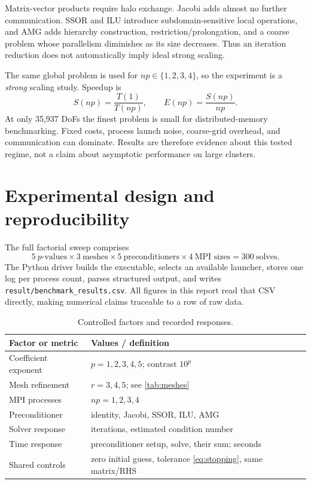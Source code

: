 \documentclass[10pt,a4paper]{article}
\begin{document}
Matrix-vector products require halo exchange. Jacobi adds almost no further communication. SSOR
and ILU introduce subdomain-sensitive local operations, and AMG adds hierarchy construction,
restriction/prolongation, and a coarse problem whose parallelism diminishes as its size decreases.
Thus an iteration reduction does not automatically imply ideal strong scaling.

The same global problem is used for $np\in\{1,2,3,4\}$, so the experiment is a \emph{strong}
scaling study. Speedup is
\begin{equation}
 S(np)=\frac{T(1)}{T(np)},\qquad E(np)=\frac{S(np)}{np}.
\end{equation}
At only 35,937 DoFs the finest problem is small for distributed-memory benchmarking. Fixed costs,
process launch noise, coarse-grid overhead, and communication can dominate. Results are therefore
evidence about this tested regime, not a claim about asymptotic performance on large clusters.

\newpage
\section{Experimental design and reproducibility}
The full factorial sweep comprises
\[
 5\ p\text{-values}\times3\ \text{meshes}\times5\ \text{preconditioners}
 \times4\ \text{MPI sizes}=300\ \text{solves}.
\]
The Python driver builds the executable, selects an available launcher, stores one log per process
count, parses structured output, and writes \texttt{result/benchmark\_results.csv}. All figures in
this report read that CSV directly, making numerical claims traceable to a row of raw data.

\begin{table}[h]
\centering
\caption{Controlled factors and recorded responses.}
\begin{tabularx}{\textwidth}{@{}lX@{}}
\toprule
Factor or metric & Values / definition\\
\midrule
Coefficient exponent & $p=1,2,3,4,5$; contrast $10^p$\\
Mesh refinement & $r=3,4,5$; see \cref{tab:meshes}\\
MPI processes & $np=1,2,3,4$\\
Preconditioner & identity, Jacobi, SSOR, ILU, AMG\\
Solver response & iterations, estimated condition number\\
Time response & preconditioner setup, solve, their sum; seconds\\
Shared controls & zero initial guess, tolerance \cref{eq:stopping}, same matrix/RHS\\
\bottomrule
\end{tabularx}
\end{table}
\end{document}
